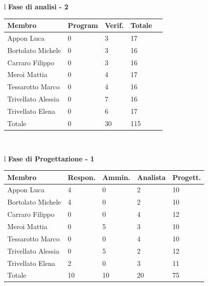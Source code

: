 \documentclass[11pt,titlepage,a4paper]{report}
\begin{document}
\begin{table}[hbtp]
\large{
\begin{tabular}{l}
\Large{\textbf{\textsf{Fase di analisi - 2}}} \\
\begin{tabular}{||p{3.5cm}||p{2cm}||p{2cm}||p{2cm}||p{2cm}||}
\hline
\textbf{Membro} & \textbf{Program} & \textbf{Verif.} & \textbf{Totale}\\
\hline
{Appon Luca}&0&3&17 \\ 
\hline 
{Bortolato Michele} &0&3&16\\ 
\hline
{Carraro Filippo}&0&3&16 \\
\hline
{Meroi Mattia}&0&4&17\\
\hline
{Tessarotto Marco} &0&4&16\\
\hline
{Trivellato Alessia} &0&7&16 \\
\hline
{Trivellato Elena} &0&6&17 \\
\hline
{Totale} &0&30&115 \\
\hline
\end{tabular} \\
\end{tabular}
}
\end{table}



\begin{table}[hbtp]
\large{
\begin{tabular}{l}
\Large{\textbf{\textsf{Fase di Progettazione - 1}}} \\
\begin{tabular}{||p{3.5cm}||p{2cm}||p{2cm}||p{2cm}||p{2cm}||}
\hline
\textbf{Membro} & \textbf{Respon.} & \textbf{Ammin.} & \textbf{Analista}
& \textbf{Progett.}\\
\hline
{Appon Luca}&4&0&2&10 \\ 
\hline 
{Bortolato Michele} &4&0&2&10\\ 
\hline
{Carraro Filippo}&0&0&4&12 \\
\hline
{Meroi Mattia}&0&5&3&10\\
\hline
{Tessarotto Marco} &0&0&4&10\\
\hline
{Trivellato Alessia} &0&5&2&12 \\
\hline
{Trivellato Elena} &2&0&3&11 \\
\hline
{Totale}& 10&10&20&75 \\
\hline
\end{tabular} \\
\end{tabular}
}
\end{table}
\end{document}
